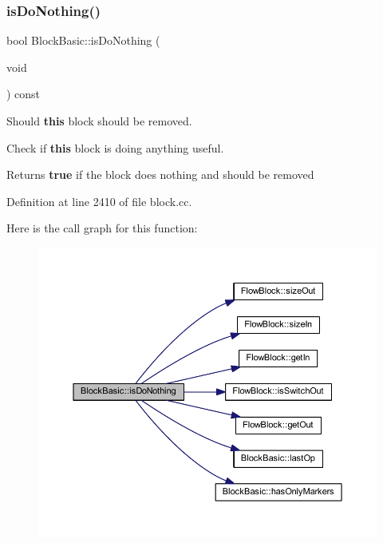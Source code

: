 \subsubsection{\texorpdfstring{isDoNothing()}{isDoNothing()}}
{\footnotesize\ttfamily bool Block\+Basic\+::is\+Do\+Nothing (\begin{DoxyParamCaption}\item[{void}]{ }\end{DoxyParamCaption}) const}



Should {\bfseries{this}} block should be removed. 

Check if {\bfseries{this}} block is doing anything useful. \begin{DoxyReturn}{Returns}
{\bfseries{true}} if the block does nothing and should be removed 
\end{DoxyReturn}


Definition at line 2410 of file block.\+cc.

Here is the call graph for this function\+:
\nopagebreak
\begin{figure}[H]
\begin{center}
\leavevmode
\includegraphics[width=350pt]{class_block_basic_a08e48137d2fd9fb3faa9c299516b9581_cgraph}
\end{center}
\end{figure}
\mbox{\label{class_block_basic_a42c5313d7980138d098e184b249b6415}} 
